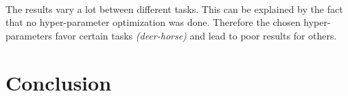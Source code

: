\documentclass[11 pt]{article}
\begin{document}
\paragraph{} The results vary a lot between different tasks. This can be explained by the fact that no hyper-parameter optimization was done. Therefore the chosen hyper-parameters favor certain tasks \textit{(deer-horse)} and lead to poor results for others.



\section{Conclusion}
\end{document}
